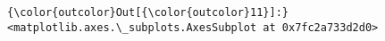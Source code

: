 \documentclass[11pt]{article}
\begin{document}
\begin{Verbatim}[commandchars=\\\{\}]
{\color{outcolor}Out[{\color{outcolor}11}]:} <matplotlib.axes.\_subplots.AxesSubplot at 0x7fc2a733d2d0>
\end{Verbatim}
            
    \begin{center}
    \end{center}
    { \hspace*{\fill} \\}
    

    
    
    
    
\end{document}
